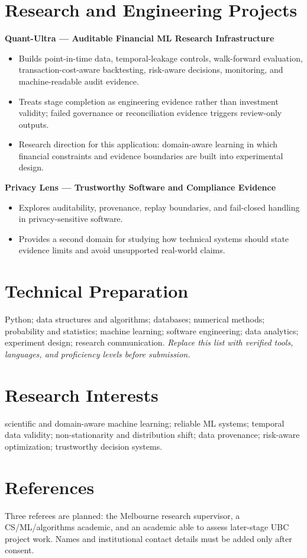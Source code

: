 \documentclass[11pt]{article}
\begin{document}
\section*{Research and Engineering Projects}
\textbf{Quant-Ultra --- Auditable Financial ML Research Infrastructure}
\begin{itemize}
\item Builds point-in-time data, temporal-leakage controls, walk-forward evaluation, transaction-cost-aware backtesting, risk-aware decisions, monitoring, and machine-readable audit evidence.
\item Treats stage completion as engineering evidence rather than investment validity; failed governance or reconciliation evidence triggers review-only outputs.
\item Research direction for this application: domain-aware learning in which financial constraints and evidence boundaries are built into experimental design.
\end{itemize}

\begin{samepage}
\textbf{Privacy Lens --- Trustworthy Software and Compliance Evidence}
\begin{itemize}
\item Explores auditability, provenance, replay boundaries, and fail-closed handling in privacy-sensitive software.
\item Provides a second domain for studying how technical systems should state evidence limits and avoid unsupported real-world claims.
\end{itemize}
\end{samepage}

\section*{Technical Preparation}
Python; data structures and algorithms; databases; numerical methods; probability and statistics; machine learning; software engineering; data analytics; experiment design; research communication. \textit{Replace this list with verified tools, languages, and proficiency levels before submission.}

\section*{Research Interests}
scientific and domain-aware machine learning; reliable ML systems; temporal data validity; non-stationarity and distribution shift; data provenance; risk-aware optimization; trustworthy decision systems.

\section*{References}
Three referees are planned: the Melbourne research supervisor, a CS/ML/algorithms academic, and an academic able to assess later-stage UBC project work. Names and institutional contact details must be added only after consent.
\end{document}
